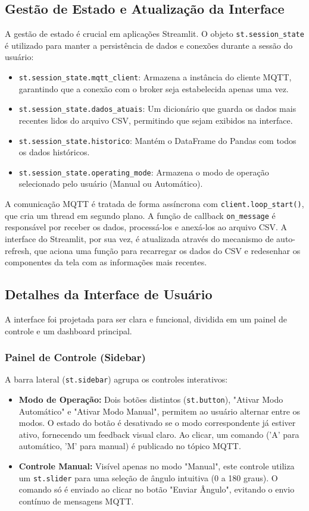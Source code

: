 \documentclass{article}
\begin{document}
\subsection{Gestão de Estado e Atualização da Interface}
A gestão de estado é crucial em aplicações Streamlit. O objeto \texttt{st.session\_state} é utilizado para manter a persistência de dados e conexões durante a sessão do usuário:
\begin{itemize}
    \item \texttt{st.session\_state.mqtt\_client}: Armazena a instância do cliente MQTT, garantindo que a conexão com o broker seja estabelecida apenas uma vez.
    \item \texttt{st.session\_state.dados\_atuais}: Um dicionário que guarda os dados mais recentes lidos do arquivo CSV, permitindo que sejam exibidos na interface.
    \item \texttt{st.session\_state.historico}: Mantém o DataFrame do Pandas com todos os dados históricos.
    \item \texttt{st.session\_state.operating\_mode}: Armazena o modo de operação selecionado pelo usuário (Manual ou Automático).
\end{itemize}
A comunicação MQTT é tratada de forma assíncrona com \texttt{client.loop\_start()}, que cria um thread em segundo plano. A função de callback \texttt{on\_message} é responsável por receber os dados, processá-los e anexá-los ao arquivo CSV. A interface do Streamlit, por sua vez, é atualizada através do mecanismo de auto-refresh, que aciona uma função para recarregar os dados do CSV e redesenhar os componentes da tela com as informações mais recentes.

\subsection{Detalhes da Interface de Usuário}
A interface foi projetada para ser clara e funcional, dividida em um painel de controle e um dashboard principal.

\subsubsection{Painel de Controle (Sidebar)}
A barra lateral (\texttt{st.sidebar}) agrupa os controles interativos:
\begin{itemize}
    \item \textbf{Modo de Operação:} Dois botões distintos (\texttt{st.button}), "Ativar Modo Automático" e "Ativar Modo Manual", permitem ao usuário alternar entre os modos. O estado do botão é desativado se o modo correspondente já estiver ativo, fornecendo um feedback visual claro. Ao clicar, um comando ('A' para automático, 'M' para manual) é publicado no tópico MQTT.
    \item \textbf{Controle Manual:} Visível apenas no modo "Manual", este controle utiliza um \texttt{st.slider} para uma seleção de ângulo intuitiva (0 a 180 graus). O comando só é enviado ao clicar no botão "Enviar Ângulo", evitando o envio contínuo de mensagens MQTT.
\end{itemize}
\end{document}
